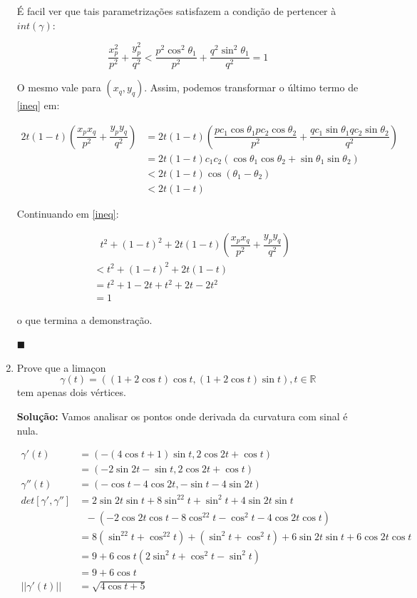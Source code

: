 \documentclass[12pt,letterpaper]{article}
\newcommand{\real}{\mathbb{R}}
\begin{document}
\begin{enumerate}[3.3.1]
	É facil ver que tais parametrizações satisfazem a condição de pertencer à $int(\gamma)$:
	
	$$\dfrac{x_p^2}{p^2}+\dfrac{y_p^2}{q^2}<\dfrac{p^2\cos^2\theta_1}{p^2}+\dfrac{q^2\sin^2\theta_1}{q^2}=1$$
	
	O mesmo vale para $(x_q,y_q)$.
	Assim, podemos transformar o último termo de \ref{ineq} em:
	
	\begin{align*}
		2t(1-t)\left(\dfrac{x_px_q}{p^2}+\dfrac{y_py_q}{q^2}\right)&=2t(1-t)\left(\dfrac{pc_1\cos\theta_1 pc_2\cos\theta_2}{p^2}+\dfrac{qc_1\sin\theta_1qc_2\sin\theta_2}{q^2}\right)\\
		&=2t(1-t)c_1c_2\left(\cos\theta_1\cos\theta_2+\sin\theta_1\sin\theta_2\right)\\
		&<2t(1-t)\cos(\theta_1-\theta_2)\\
		&<2t(1-t)
	\end{align*}

	Continuando em \ref{ineq}:
	
	\begin{align*}
		&~~~t^2+(1-t)^2+2t(1-t)\left(\dfrac{x_px_q}{p^2}+\dfrac{y_py_q}{q^2}\right)\\
		&<t^2+(1-t)^2+2t(1-t)\\
		&=t^2+1-2t+t^2+2t-2t^2\\
		&=1
	\end{align*}

	o que termina a demonstração.
	\begin{flushright}
	$\blacksquare$
	\end{flushright}

		\item Prove que a limaçon 
		$$\gamma(t)=((1+2\cos t)\cos t,(1+2\cos t)\sin t),t\in\real$$             
		 tem apenas dois vértices.
		 
		 \textbf{Solução: } Vamos analisar os pontos onde derivada da curvatura com sinal é nula.
		 
		 \begin{align*}
		 	\gamma'(t)&=(-(4 \cos t + 1)\sin t, 2\cos2t + \cos t )\\
		 	&=(-2\sin2t-\sin t,2\cos2t+\cos t)\\
		 	\gamma''(t)&=(-\cos t - 4 \cos2t, -\sin t - 4 \sin2t)\\
		 	det[\gamma',\gamma'']&=2\sin2t\sin t+8\sin^22t+\sin^2t+4\sin2t\sin t\\
		 	&~~~-(-2\cos2t\cos t-8\cos^22t-\cos^2t-4\cos2t\cos t)\\
		 	&=8(\sin^22t+\cos^22t)+(\sin^2t+\cos^2t)+6\sin2t\sin t+6\cos2t\cos t\\
		 	&=9+6\cos t(2\sin^2t+\cos^2t-\sin^2t)\\
		 	&=9+6\cos t\\
		 	||\gamma'(t)||&=\sqrt{4\cos t+5}
      \end{align*}
  

\end{enumerate}
\end{document}
